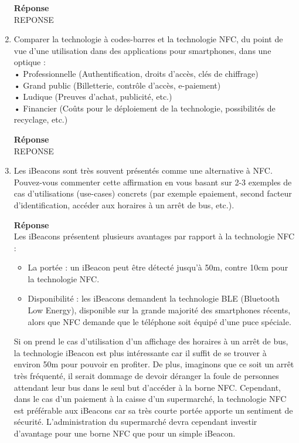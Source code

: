 \documentclass[a4paper]{article}
\begin{document}
\begin{enumerate}
    \textbf{Réponse} \\
    REPONSE
	
    \item Comparer la technologie à codes-barres et la technologie NFC, du point de vue d'une utilisation dans des applications pour smartphones, dans une optique : \\
    • Professionnelle (Authentification, droits d’accès, clés de chiffrage) \\
    • Grand public (Billetterie, contrôle d’accès, e-paiement) \\
    • Ludique (Preuves d'achat, publicité, etc.) \\
    • Financier (Coûts pour le déploiement de la technologie, possibilités de recyclage, etc.)
    
    \textbf{Réponse} \\
    REPONSE
    
    \item Les iBeacons sont très souvent présentés comme une alternative à NFC. Pouvez-vous commenter cette affirmation en vous basant sur 2-3 exemples de cas d'utilisations (use-cases) concrets (par exemple epaiement, second facteur d'identification, accéder aux horaires à un arrêt de bus, etc.).
    
    \textbf{Réponse} \\
    Les iBeacons présentent plusieurs avantages par rapport à la technologie NFC :
    \begin{itemize}
    		\item La portée : un iBeacon peut être détecté jusqu'à 50m, contre 10cm pour la technologie NFC.
    		\item Disponibilité : les iBeacons demandent la technologie BLE (Bluetooth Low Energy), disponible sur la grande majorité des smartphones récents, alors que NFC demande que le téléphone soit équipé d'une puce spéciale.
    \end{itemize}
    
    	Si on prend le cas d'utilisation d'un affichage des horaires à un arrêt de bus, la technologie iBeacon est plus intéressante car il suffit de se trouver à environ 50m pour pouvoir en profiter. De plus, imaginons que ce soit un arrêt très fréquenté, il serait dommage de devoir déranger la foule de personnes attendant leur bus dans le seul but d'accéder à la borne NFC. Cependant, dans le cas d'un paiement à la caisse d'un supermarché, la technologie NFC est préférable aux iBeacons car sa très courte portée apporte un sentiment de sécurité. L'administration du supermarché devra cependant investir d'avantage pour une borne NFC que pour un simple iBeacon.
    

\end{enumerate}
\end{document}

